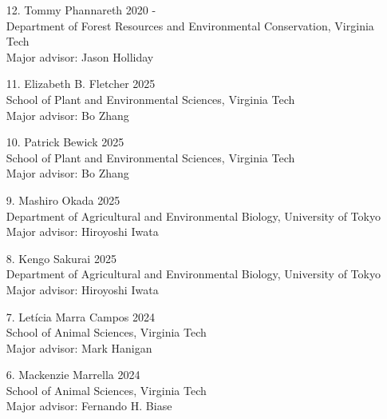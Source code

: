 \documentclass[margin,line,10pt]{res}
\begin{document}
\begin{resume}
\begin{enumerate}
  \item [12.] Tommy Phannareth \hfill 2020 - \\
  Department of Forest Resources and Environmental Conservation, Virginia Tech \\
  Major advisor: Jason Holliday

  \vspace{0.3cm}

  \item [11.] Elizabeth B. Fletcher  \hfill 2025 \\
  School of Plant and Environmental Sciences,  Virginia Tech \\
  Major advisor: Bo Zhang  

  \vspace{0.3cm}

  \item [10.] Patrick Bewick  \hfill 2025 \\
  School of Plant and Environmental Sciences,  Virginia Tech \\
  Major advisor: Bo Zhang  

  \vspace{0.3cm}

  \item [9.] Mashiro Okada \hfill 2025 \\
  Department of Agricultural and Environmental Biology,  University of Tokyo \\ 
  Major advisor: Hiroyoshi Iwata

  \vspace{0.3cm}

  \item [8.] Kengo Sakurai \hfill 2025 \\
  Department of Agricultural and Environmental Biology,  University of Tokyo \\ 
  Major advisor: Hiroyoshi Iwata

  \vspace{0.3cm}

  \item [7.] Let\'{i}cia Marra Campos  \hfill 2024 \\
  School of Animal Sciences,  Virginia Tech \\ 
  Major advisor: Mark Hanigan

  \vspace{0.3cm}


   \item [6.] Mackenzie Marrella \hfill 2024 \\
      School of Animal Sciences, Virginia Tech\\
      Major advisor: Fernando H. Biase
  

\end{enumerate}
\end{resume}
\end{document}
